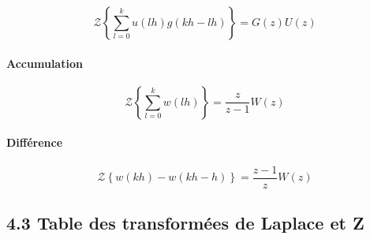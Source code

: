 \documentclass[11pt]{article}
\begin{document}
\[ \mathscr{Z}\left\{\sum_{l=0}^{k}u(lh)g(kh-lh)\right\} = G(z)U(z) \]

\paragraph{Accumulation}\label{accumulation}

\[ \mathscr{Z}\left\{\sum_{l=0}^{k}w(lh)\right\} = \frac{z}{z-1}W(z) \]

\paragraph{Différence}\label{diffuxe9rence}

\[ \mathscr{Z}\left\{w(kh)-w(kh-h)\right\} = \frac{z-1}{z}W(z) \]

\newpage
    \subsection{4.3 Table des transformées de Laplace et
Z}\label{table-des-transformuxe9es-de-laplace-et-z}
\end{document}
